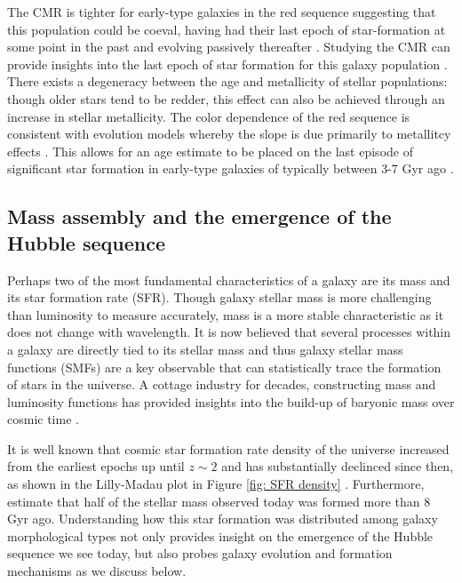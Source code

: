 The CMR is tighter for early-type galaxies in the red sequence suggesting that this population could be coeval, having had their last epoch of star-formation at some point in the past and evolving passively thereafter \citep{Bower1992}. Studying the CMR can provide insights into the last epoch of star formation for this galaxy population \citep{Sandage1978, Tully1982}. There exists a degeneracy between the age and metallicity of stellar populations: though older stars tend to be redder, this effect can also be achieved through an increase in stellar metallicity. The color dependence of the red sequence is consistent with evolution models whereby the slope is due primarily to metallitcy effects \citep{Bower1992, Kodama1997}. This allows for an age estimate to be placed on the last episode of significant star formation in early-type galaxies of typically between 3-7 Gyr ago \citep[e.g.,][]{LopezCruz2004}.%



\subsection{Mass assembly and the emergence of the Hubble sequence}
\label{sec: mass assembly}

Perhaps two of the most fundamental characteristics of a galaxy are its mass and its star formation rate (SFR). Though galaxy stellar mass is more challenging than luminosity to measure accurately, mass is a more stable characteristic as it does not change with wavelength. It is now believed that several processes within a galaxy are directly tied to its stellar mass and thus galaxy stellar mass functions (SMFs) are a key observable that can statistically trace the formation of stars in the universe.  A cottage industry for decades, constructing mass and luminosity functions has provided insights into the build-up of baryonic mass over cosmic time \citep{Steidel1999,Ouchi2004,Giavalisco2004,Drory2005,Fontana2006,Marchesini2009,Caputi2011,Gonzalez2011,Lee2012,Ilbert2013,Bernardi2013,Duncan2014}. 


It is well known that cosmic star formation rate density of the universe increased from the earliest epochs up until $z\sim2$ and has substantially declinced since then, as shown in the Lilly-Madau plot in Figure \ref{fig: SFR density} \citep[and references therein]{Madau2014}. Furthermore, \cite{Madau2014} estimate that half of the stellar mass observed today was formed more than 8 Gyr ago. Understanding how this star formation was distributed among galaxy morphological types not only provides insight on the emergence of the Hubble sequence we see today, but also probes galaxy evolution and formation mechanisms as we discuss below.

